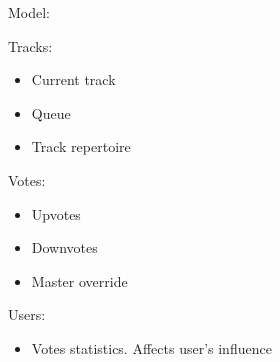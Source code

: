 \label{sec:architecture}


Model:

Tracks:
\begin{itemize}
  \item Current track
  \item Queue
  \item Track repertoire
\end{itemize}

Votes:
\begin{itemize}
  \item Upvotes
  \item Downvotes
  \item Master override
\end{itemize}

Users:
\begin{itemize}
  \item Votes statistics. Affects user's influence
\end{itemize}
